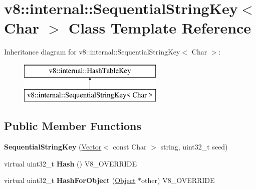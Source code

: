 \hypertarget{classv8_1_1internal_1_1_sequential_string_key}{}\section{v8\+:\+:internal\+:\+:Sequential\+String\+Key$<$ Char $>$ Class Template Reference}
\label{classv8_1_1internal_1_1_sequential_string_key}
Inheritance diagram for v8\+:\+:internal\+:\+:Sequential\+String\+Key$<$ Char $>$\+:\begin{figure}[H]
\begin{center}
\leavevmode
\includegraphics[height=2.000000cm]{classv8_1_1internal_1_1_sequential_string_key}
\end{center}
\end{figure}
\subsection*{Public Member Functions}
\begin{DoxyCompactItemize}
\item 
\hypertarget{classv8_1_1internal_1_1_sequential_string_key_a8e111bccfdc098c61428e82fec78a26c}{}{\bfseries Sequential\+String\+Key} (\hyperlink{classv8_1_1internal_1_1_vector}{Vector}$<$ const Char $>$ string, uint32\+\_\+t seed)\label{classv8_1_1internal_1_1_sequential_string_key_a8e111bccfdc098c61428e82fec78a26c}

\item 
\hypertarget{classv8_1_1internal_1_1_sequential_string_key_a50d36e0b741e5e243b83fa0bd7a18971}{}virtual uint32\+\_\+t {\bfseries Hash} () V8\+\_\+\+O\+V\+E\+R\+R\+I\+D\+E\label{classv8_1_1internal_1_1_sequential_string_key_a50d36e0b741e5e243b83fa0bd7a18971}

\item 
\hypertarget{classv8_1_1internal_1_1_sequential_string_key_a770cc4e808e2330b98526bcd2ba5af56}{}virtual uint32\+\_\+t {\bfseries Hash\+For\+Object} (\hyperlink{classv8_1_1internal_1_1_object}{Object} $\ast$other) V8\+\_\+\+O\+V\+E\+R\+R\+I\+D\+E\label{classv8_1_1internal_1_1_sequential_string_key_a770cc4e808e2330b98526bcd2ba5af56}

\end{DoxyCompactItemize}
